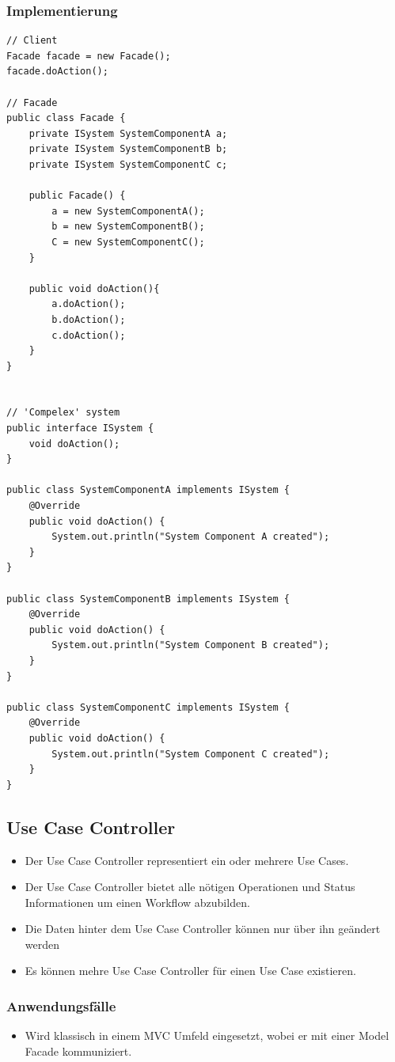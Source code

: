 \subsubsection{Implementierung}
\begin{lstlisting}
// Client
Facade facade = new Facade();
facade.doAction();

// Facade
public class Facade {
	private ISystem SystemComponentA a;
	private ISystem SystemComponentB b;
	private ISystem SystemComponentC c;
	
	public Facade() {
		a = new SystemComponentA();
		b = new SystemComponentB();
		C = new SystemComponentC();
	}
	
	public void doAction(){
		a.doAction();
		b.doAction();
		c.doAction();
	}
}


// 'Compelex' system
public interface ISystem {
	void doAction();
}

public class SystemComponentA implements ISystem {
	@Override
	public void doAction() {
		System.out.println("System Component A created");
	}
}

public class SystemComponentB implements ISystem {
	@Override
	public void doAction() {
		System.out.println("System Component B created");
	}
}

public class SystemComponentC implements ISystem {
	@Override
	public void doAction() {
		System.out.println("System Component C created");
	}
}
\end{lstlisting}


\clearpage

\subsection{Use Case Controller}
\label{sec:usecasecontroller}

\begin{itemize}
	\item Der Use Case Controller representiert ein oder mehrere Use Cases. 
	\item Der Use Case Controller bietet alle nötigen Operationen und Status Informationen um einen Workflow abzubilden.
	\item Die Daten hinter dem Use Case Controller können nur über ihn geändert werden
	\item Es können mehre Use Case Controller für einen Use Case existieren.
\end{itemize}

\subsubsection{Anwendungsfälle}
\begin{itemize}
	\item Wird klassisch in einem MVC Umfeld eingesetzt, wobei er mit einer Model Facade kommuniziert.
\end{itemize}

